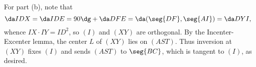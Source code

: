 For part (b), note that \[\da IDX=\da IDE=90\dg+\da DFE=\da(\seg{DF},\seg{AI})=\da DYI,\]
whence $IX\cdot IY=ID^2$, so $(I)$ and $(XY)$ are orthogonal. By the Incenter-Excenter lemma, the center $L$ of $(XY)$ lies on $(AST)$. Thus inversion at $(XY)$ fixes $(I)$ and sends $(AST)$ to $\seg{BC}$, which is tangent to $(I)$, as desired.
